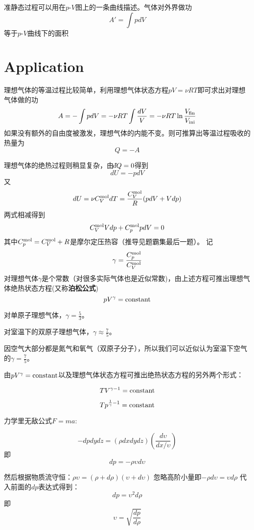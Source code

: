 \documentclass[CJK]{beamer}
\begin{document}
\begin{frame}
\bch
准静态过程可以用在$p$-$V$图上的一条曲线描述。气体对外界做功
$$ A' = \int p dV $$
等于$p$-$V$曲线下的面积

\ech
\end{frame}

\section{Application}

\begin{frame}
\bch
理想气体的等温过程比较简单，利用理想气体状态方程$pV = \nu RT$即可求出对理想气体做的功
$$ A = -\int p dV = -\nu R T \int \frac{dV}{V} =- \nu R T\ln\frac{V_{\rm fin}}{V_{\rm ini}}$$
如果没有额外的自由度被激发，理想气体的内能不变。则可推算出等温过程吸收的热量为
$$ Q = - A $$
\ech
\end{frame}


\begin{frame}
\bch
{\small
理想气体的绝热过程则稍显复杂，由$\dbar Q=0$得到
$$ dU = -p dV$$
又$$ dU = \nu C_V^{\rm mol} dT = \frac{C_V^{\rm mol}}{R}(p dV + V dp)$$
两式相减得到
$$ C_V^{\rm mol} Vdp + C_p^{\rm mol} p dV = 0$$
其中$C_p^{\rm mol} = C_V^{\rm mol} + R$是摩尔定压热容（推导见题霸集最后一题）。
记$$\gamma = \frac{C_p^{\rm mol}}{C_V^{\rm mol}}$$
对理想气体$\gamma$是个常数（对很多实际气体也是近似常数)，由上述方程可推出{\blue 理想气体绝热状态方程}(又称{\bf 泊松公式})
{\blue 
$$p V^\gamma = \mathrm{constant}$$}
}
\ech
\end{frame}


\begin{frame}
\bch
{\small
对单原子理想气体，$\gamma = \frac{5}{3}$。

\skipline

对室温下的双原子理想气体，$\gamma \approx \frac{7}{5}$。

\skipline

因空气大部分都是氮气和氧气（双原子分子），所以我们可以近似认为室温下空气的$\gamma = \frac{7}{5}$。
}

由$pV^\gamma = \mathrm{constant} $以及理想气体状态方程可推出绝热状态方程的另外两个形式：

$$ TV^{\gamma-1} = \mathrm{constant}$$

$$T p^{\frac{1}{\gamma}-1} = \mathrm{constant} $$
\ech
\end{frame}

\begin{frame}
\bch
{}

{\scriptsize
力学里无敌公式$F = ma$:

$$ -dp dy dz = (\rho dx dy dz) \left(\frac{d\upsilon}{dx/\upsilon}\right) $$
即
$$ dp = - \rho \upsilon d\upsilon $$

然后根据物质流守恒：$ \rho \upsilon = (\rho + d\rho)(\upsilon+d\upsilon)$
忽略高阶小量即$ -\rho d\upsilon = \upsilon d\rho$
代入前面的$dp$表达式得到：
$$ dp = \upsilon ^2 d\rho$$
即
$$\upsilon = \sqrt{\frac{dp}{d\rho}}$$
}
\ech
\end{frame}
\end{document}
